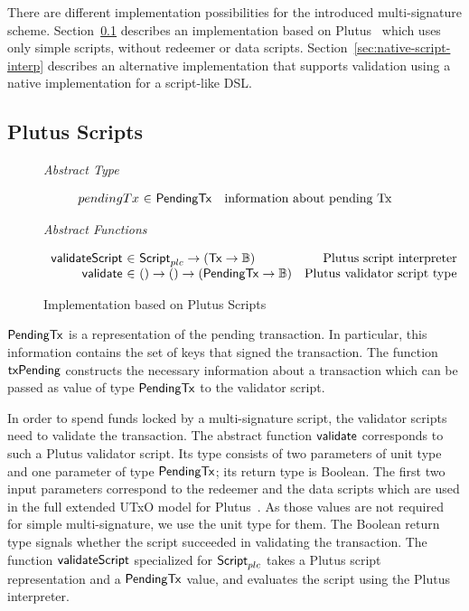 \documentclass[11pt,a4paper,dvipsnames,twosided]{article}
\newcommand{\Bool}{\ensuremath{\mathbb{B}}}
\newcommand{\Tx}{\type{Tx}}
\newcommand{\Script}{\type{Script}}
\newcommand{\ScriptPlutus}{\Script_{plc}}
\newcommand{\PendingTx}{\type{PendingTx}}
\theoremstyle{definition}
\begin{document}
There are different implementation possibilities for the introduced
multi-signature scheme. Section~\ref{sec:plutus-scripts} describes an
implementation based on Plutus~\cite{plutus_eutxo} which uses only simple
scripts, without redeemer or data
scripts. Section~\ref{sec:native-script-interp} describes an alternative
implementation that supports validation using a
native implementation for a script-like DSL.

\subsection{Plutus Scripts}
\label{sec:plutus-scripts}

\begin{figure*}[hbt]
  \emph{Abstract Type}

  \begin{equation*}
    \begin{array}{r@{~\in~}lr}
      pendingTx & \PendingTx & \text{information about pending Tx}
    \end{array}
  \end{equation*}

  \emph{Abstract Functions}

  \begin{equation*}
    \begin{array}{r@{~\in~}lr}
      \fun{validateScript} & \ScriptPlutus \to (\Tx \to \Bool) & \text{Plutus script
                                                               interpreter} \\
      \fun{validate} & () \to () \to (\PendingTx \to \Bool) & \text{Plutus
                                                            validator script type}
    \end{array}
  \end{equation*}
  \caption{Implementation based on Plutus Scripts}
  \label{fig:types_defs_plutus}
\end{figure*}

$\PendingTx$ is a representation of the pending transaction. In particular, this
information contains the set of keys that signed the transaction. The function
$\mathsf{txPending}$ constructs the necessary information about a transaction
which can be passed as value of type $\PendingTx$ to the validator script.

In order to spend funds locked by a multi-signature script, the validator
scripts need to validate the transaction. The abstract function $\mathsf{validate}$
corresponds to such a Plutus validator script. Its type consists of two
parameters of unit type and one parameter of type $\PendingTx$; its return type
is Boolean. The first two input parameters correspond to the redeemer and the
data scripts which are used in the full extended UTxO model for
Plutus~\cite{plutus_eutxo}. As those values are not required for simple
multi-signature, we use the unit type for them. The Boolean return type signals
whether the script succeeded in validating the transaction. The function
$\mathsf{validateScript}$ specialized for $\ScriptPlutus$ takes a Plutus script
representation and a $\PendingTx$ value, and evaluates the script using the
Plutus interpreter.
\end{document}
